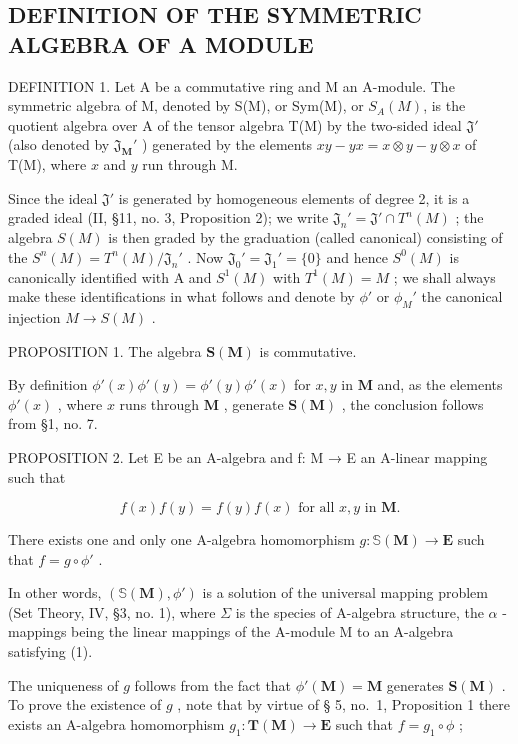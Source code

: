 \subsection{DEFINITION OF THE SYMMETRIC ALGEBRA OF A MODULE}

DEFINITION 1. Let A be a commutative ring and M an A-module. The symmetric algebra of M, denoted by S(M), or Sym(M), or \(S_{A}(M)\), is the quotient algebra over A of the tensor algebra T(M) by the two-sided ideal \(\mathfrak{J}'\) (also denoted by \(\mathfrak{J}_{\mathbf{M}}'\) ) generated by the elements \(xy - yx = x \otimes y - y \otimes x\) of T(M), where \(x\) and \(y\) run through M.

Since the ideal \(\mathfrak{J}'\) is generated by homogeneous elements of degree 2, it is a graded ideal (II, §11, no. 3, Proposition 2); we write \(\mathfrak{J}_n' = \mathfrak{J}' \cap T^n(M)\) ; the algebra \(S(M)\) is then graded by the graduation (called canonical) consisting of the \(S^n(M) = T^n(M)/\mathfrak{J}_n'\) . Now \(\mathfrak{J}_0' = \mathfrak{J}_1' = \{0\}\) and hence \(S^0(M)\) is canonically identified with A and \(S^1(M)\) with \(T^1(M) = M\) ; we shall always make these identifications in what follows and denote by \(\phi'\) or \(\phi_M'\) the canonical injection \(M \to S(M)\) .

PROPOSITION 1. The algebra \(\mathbf{S}(\mathbf{M})\) is commutative.

By definition \(\phi'(x)\phi'(y) = \phi'(y)\phi'(x)\) for \(x, y\) in \(\mathbf{M}\) and, as the elements \(\phi'(x)\) , where \(x\) runs through \(\mathbf{M}\) , generate \(\mathbf{S}(\mathbf{M})\) , the conclusion follows from §1, no. 7.

PROPOSITION 2. Let E be an A-algebra and f: M → E an A-linear mapping such that

\[
f (x) f (y) = f (y) f (x) \text {   for   all   } x, y \text {   in   } \mathbf {M}.\tag{1}
\]

There exists one and only one A-algebra homomorphism \(g \colon \mathbb{S}(\mathbf{M}) \to \mathbf{E}\) such that \(f = g \circ \phi'\) .

In other words, \((\mathbb{S}(\mathbf{M}), \phi')\) is a solution of the universal mapping problem (Set Theory, IV, §3, no. 1), where \(\Sigma\) is the species of A-algebra structure, the \(\alpha\) -mappings being the linear mappings of the A-module M to an A-algebra satisfying (1).

The uniqueness of \(g\) follows from the fact that \(\phi'(\mathbf{M}) = \mathbf{M}\) generates \(\mathbf{S}(\mathbf{M})\) . To prove the existence of \(g\) , note that by virtue of § 5, no.~1, Proposition 1 there exists an A-algebra homomorphism \(g_1: \mathbf{T}(\mathbf{M}) \to \mathbf{E}\) such that \(f = g_1 \circ \phi\) ;


